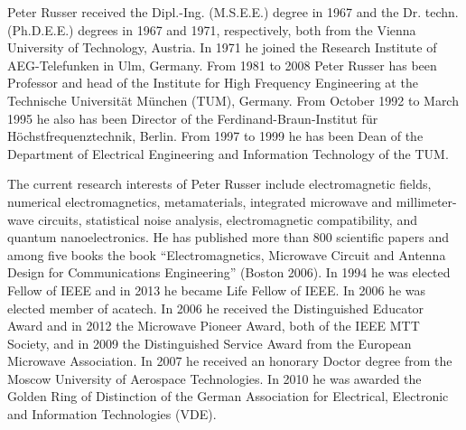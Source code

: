\documentclass[journal]{IEEEtran}
\begin{document}
\begin{IEEEbiography}
{Peter Russer} received the Dipl.-Ing. (M.S.E.E.) degree in 1967 and the Dr. techn.  (Ph.D.E.E.) degrees in 1967 and 1971, respectively, both from the Vienna University of Technology, Austria. In 1971 he joined the Research Institute of AEG-Telefunken in Ulm, Germany. From 1981 to 2008 Peter Russer has been Professor and head of the Institute for High Frequency Engineering at the Technische Universit\"at M\"unchen (TUM), Germany. From October 1992 to March 1995 he also has been Director of the Ferdinand-Braun-Institut f\"ur H\"ochstfrequenztechnik, Berlin. From 1997 to 1999 he has been Dean of the Department of Electrical Engineering and Information Technology of the TUM. 

The current research interests of Peter Russer include electromagnetic fields, numerical electromagnetics, metamaterials, integrated microwave and millimeter-wave circuits, statistical noise analysis, electromagnetic compatibility, and  quantum nanoelectronics.
He has published  more than 800 scientific papers and among five books the book ``Electromagnetics, Microwave Circuit and Antenna Design for Communications Engineering'' (Boston 2006). In 1994 he was elected Fellow of  IEEE and in 2013 he became Life Fellow of  IEEE. In 2006 he was elected member of acatech. In 2006 he received the Distinguished Educator Award and in 2012 the Microwave Pioneer Award, both of the IEEE MTT Society, and in 2009 the Distinguished Service Award from the European Microwave Association. In 2007 he received an honorary Doctor degree from the Moscow University of Aerospace Technologies. In 2010 he was awarded the Golden Ring of Distinction of the German Association for Electrical, Electronic and Information Technologies (VDE). 
\end{IEEEbiography}
%
\end{document}
